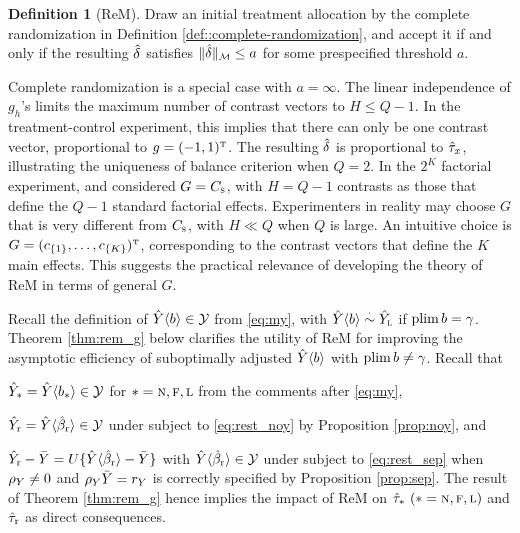\documentclass[11pt]{article}
\theoremstyle{definition}
\newtheorem{definition}{Definition}
\begin{document}
\begin{definition}
[ReM]\label{def::rem-factorial} 
Draw an initial treatment allocation by the complete randomization in Definition \ref{def::complete-randomization}, and accept it  if and only if the resulting $\hat\delta$ satisfies $\|\hd\|_\mm     \leq a$ for some prespecified threshold $a$. 
\end{definition}


Complete randomization is a special case with $a = \infty$. 
The linear independence of $g_h$'s limits the maximum number of contrast vectors  to $H \leq Q-1$.
In the treatment-control experiment, this implies that there can only be one contrast vector, proportional to $g=(-1,1)^{ \mathrm{\scriptscriptstyle T} }$. The resulting $\hat\delta$ is proportional to $\hat\tau_x$, illustrating the uniqueness of balance criterion when $Q=2$. 
In the $2^K$ factorial experiment, \citet{branson} and \citet{AOS} considered $G = C_{\textsc{s}}$, with $H = Q-1$ contrasts as those that define the $Q-1$ standard factorial effects. 
Experimenters in reality may choose $G$ that is very different from $C_{\textsc{s}}$, with $H \ll Q$ when $Q$ is large.
An intuitive choice is  $G = (c_{\{1\}}, \ldots, c_{\{K\}})^{ \mathrm{\scriptscriptstyle T} }$, corresponding to the contrast vectors that define the $K$ main effects.  
This suggests the practical relevance of developing the theory of ReM in terms of general $G$.    




Recall the definition of $\hat Y\langle b \rangle\in \mathcal{Y}$ from \eqref{eq:my}, with $\hat Y\langle b \rangle\overset{\cdot}{\sim} \hat Y_{\textsc{l}}$ if $\textup{plim\,} b = \gamma$. Theorem \ref{thm:rem_g} below clarifies the utility of ReM for improving the asymptotic efficiency of suboptimally adjusted $\hat Y\langle b \rangle$ with $\textup{plim\,} b \neq \gamma$. 
Recall that 
\begine[(i)]
\item $\hat Y_* = \hat Y\langle b_*\rangle \in\mathcal{Y}$ for $* =\textsc{n}, \textsc{f}, \textsc{l}$ from the comments after \eqref{eq:my}, 
\item  $\hat Y_{\textup{r}}  = \hat Y\langle \hat\beta_{\textup{r}}\rangle  \in\mathcal{Y}$ under \rlss subject to \eqref{eq:rest_noy} by Proposition  \ref{prop:noy}, and 
\item $\hat Y_{\textup{r}}  - \bar Y = U \{\hat Y\langle \hat\beta_{\textup{r}}\rangle  - \bar Y\}$ with $\hat Y\langle \hat\beta_{\textup{r}}\rangle  \in\mathcal{Y}$ under \rlss subject to \eqref{eq:rest_sep} when $\rho_Y \neq 0$ and $\rho_Y\bar Y =r_Y$ is  correctly specified by Proposition \ref{prop:sep}.
\ende
The result of Theorem \ref{thm:rem_g} hence implies the impact of ReM on $\hat\tau_*  \ ( * =\textsc{n}, \textsc{f}, \textsc{l})$ and $\hat\tau_{\textup{r}}$ as direct consequences. 
\end{document}

